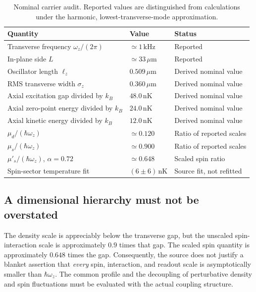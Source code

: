 \documentclass[11pt,a4paper]{article}
\theoremstyle{definition}
\theoremstyle{remark}
\newcommand{\musp}{\mu'_s}
\newcommand{\lop}{\ell_z}
\begin{document}
\begin{table}[htbp]
\centering\small
\caption{Nominal carrier audit. Reported values are distinguished from calculations under the harmonic, lowest-transverse-mode approximation.}
\label{tab:scales}
\begin{tabular}{@{}L{0.40\textwidth}L{0.22\textwidth}L{0.29\textwidth}@{}}
\toprule Quantity & Value & Status\\\midrule
Transverse frequency $\omega_z/(2\pi)$ & $\simeq1\,\mathrm{kHz}$ & Reported\cite{zhang2026}\\
In-plane side $L$ & $\simeq33\,\mu\mathrm m$ & Reported\cite{zhang2026}\\
Oscillator length $\lop$ & $0.509\,\mu\mathrm m$ & Derived nominal value\\
RMS transverse width $\sigma_z$ & $0.360\,\mu\mathrm m$ & Derived nominal value\\
Axial excitation gap divided by $k_B$ & $48.0\,\mathrm{nK}$ & Derived nominal value\\
Axial zero-point energy divided by $k_B$ & $24.0\,\mathrm{nK}$ & Derived nominal value\\
Axial kinetic energy divided by $k_B$ & $12.0\,\mathrm{nK}$ & Derived nominal value\\
$\mu_d/(\hbar\omega_z)$ & $\simeq0.120$ & Ratio of reported scales\\
$\mu_s/(\hbar\omega_z)$ & $\simeq0.900$ & Ratio of reported scales\\
$\musp/(\hbar\omega_z)$, $\alpha=0.72$ & $\simeq0.648$ & Scaled spin ratio\\
Spin-sector temperature fit & $(6\pm6)\,\mathrm{nK}$ & Source fit, not refitted\\
\bottomrule
\end{tabular}
\end{table}

\subsection{A dimensional hierarchy must not be overstated}
The density scale is appreciably below the transverse gap, but the unscaled spin-interaction scale is approximately $0.9$ times that gap. The scaled spin quantity is approximately $0.648$ times the gap. Consequently, the source does not justify a blanket assertion that \emph{every} spin, interaction, and readout scale is asymptotically smaller than $\hbar\omega_z$. The common profile and the decoupling of perturbative density and spin fluctuations must be evaluated with the actual coupling structure.\cite{zhang2026,precursor}
\end{document}
